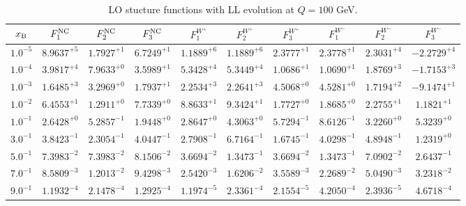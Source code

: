 \begin{table}[h]
\begin{adjustbox}{width=\textwidth}
\begin{tabular}{|c||c|c|c|c|c|c|c|c|c|}
\hline
$x_{\rm B}$ & $F_1^{\rm NC}$ & $F_2^{\rm NC}$ & $F_3^{\rm NC}$ & $F_1^{W^+}$ & $F_2^{W^+}$ & $F_3^{W^+}$ & $F_1^{W^-}$ & $F_2^{W^-}$ & $F_3^{W^-}$ \\
\hline
$ 1.0^{-5}$ & $ 8.9637^{+5}$ & $ 1.7927^{+1}$ & $ 6.7249^{+1}$ & $ 1.1889^{+6}$ & $ 1.1889^{+6}$ & $ 2.3777^{+1}$ & $ 2.3778^{+1}$ & $ 2.3031^{+4}$ & $-2.2729^{+4}$ \\
$ 1.0^{-4}$ & $ 3.9817^{+4}$ & $ 7.9633^{+0}$ & $ 3.5989^{+1}$ & $ 5.3428^{+4}$ & $ 5.3449^{+4}$ & $ 1.0686^{+1}$ & $ 1.0690^{+1}$ & $ 1.8769^{+3}$ & $-1.7153^{+3}$ \\
$ 1.0^{-3}$ & $ 1.6485^{+3}$ & $ 3.2969^{+0}$ & $ 1.7937^{+1}$ & $ 2.2534^{+3}$ & $ 2.2641^{+3}$ & $ 4.5068^{+0}$ & $ 4.5281^{+0}$ & $ 1.7194^{+2}$ & $-9.1474^{+1}$ \\
$ 1.0^{-2}$ & $ 6.4553^{+1}$ & $ 1.2911^{+0}$ & $ 7.7339^{+0}$ & $ 8.8633^{+1}$ & $ 9.3424^{+1}$ & $ 1.7727^{+0}$ & $ 1.8685^{+0}$ & $ 2.2755^{+1}$ & $ 1.1821^{+1}$ \\
$ 1.0^{-1}$ & $ 2.6428^{+0}$ & $ 5.2857^{-1}$ & $ 1.9448^{+0}$ & $ 2.8647^{+0}$ & $ 4.3063^{+0}$ & $ 5.7294^{-1}$ & $ 8.6126^{-1}$ & $ 3.2260^{+0}$ & $ 5.3239^{+0}$ \\
$ 3.0^{-1}$ & $ 3.8423^{-1}$ & $ 2.3054^{-1}$ & $ 4.0447^{-1}$ & $ 2.7908^{-1}$ & $ 6.7164^{-1}$ & $ 1.6745^{-1}$ & $ 4.0298^{-1}$ & $ 4.8948^{-1}$ & $ 1.2319^{+0}$ \\
$ 5.0^{-1}$ & $ 7.3983^{-2}$ & $ 7.3983^{-2}$ & $ 8.1506^{-2}$ & $ 3.6694^{-2}$ & $ 1.3473^{-1}$ & $ 3.6694^{-2}$ & $ 1.3473^{-1}$ & $ 7.0902^{-2}$ & $ 2.6437^{-1}$ \\
$ 7.0^{-1}$ & $ 8.5809^{-3}$ & $ 1.2013^{-2}$ & $ 9.4298^{-3}$ & $ 2.5420^{-3}$ & $ 1.6206^{-2}$ & $ 3.5589^{-3}$ & $ 2.2689^{-2}$ & $ 5.0490^{-3}$ & $ 3.2318^{-2}$ \\
$ 9.0^{-1}$ & $ 1.1932^{-4}$ & $ 2.1478^{-4}$ & $ 1.2925^{-4}$ & $ 1.1974^{-5}$ & $ 2.3361^{-4}$ & $ 2.1554^{-5}$ & $ 4.2050^{-4}$ & $ 2.3936^{-5}$ & $ 4.6718^{-4}$ \\
\hline
\end{tabular}
\end{adjustbox}\caption{LO stucture functions with LL evolution at $Q = 100$ GeV.}
\label{tab:N0LO-Q100}
\end{table}


